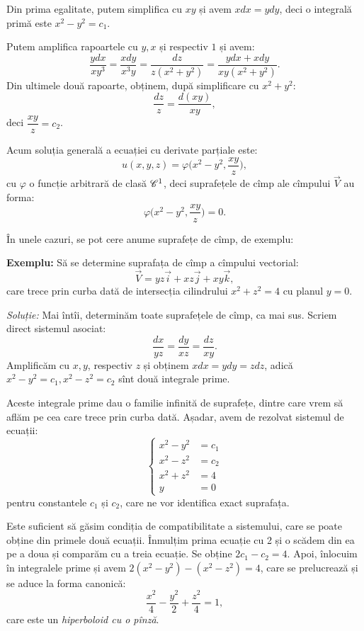 Din prima egalitate, putem simplifica cu $ xy $ și avem $ xdx = ydy $, deci
o integrală primă este $ x^2 - y^2 = c_1 $.

Putem amplifica rapoartele cu $ y, x $ și respectiv $ 1 $ și avem:
\[
  \dfrac{ydx}{xy^3} = \dfrac{xdy}{x^3y} = \dfrac{dz}{z(x^2 + y^2)} = %
  \dfrac{ydx + xdy}{xy(x^2 + y^2)}.
\]
Din ultimele două rapoarte, obținem, după simplificare cu $ x^2 + y^2 $:
\[
  \dfrac{dz}{z} = \dfrac{d(xy)}{xy},
\]
deci $ \dfrac{xy}{z} = c_2 $.

Acum soluția generală a ecuației cu derivate parțiale este:
\[
  u(x, y, z) = \varphi\Big(x^2 - y^2, \dfrac{xy}{z} \Big),
\]
cu $ \varphi $ o funcție arbitrară de clasă $ \mathscr{C}^1 $, deci suprafețele de
cîmp ale cîmpului $ \vec{V} $ au forma:
\[
  \varphi\Big( x^2 - y^2, \dfrac{xy}{z} \Big) = 0.
\]

\vspace{1cm}

În unele cazuri, se pot cere anume suprafețe de cîmp, de exemplu:

\textbf{Exemplu:} Să se determine suprafața de cîmp a cîmpului vectorial:
\[
  \vec{V} = yz\vec{i} + xz \vec{j} + xy\vec{k},
\]
care trece prin curba dată de intersecția cilindrului $ x^2 + z^2 = 4 $ cu
planul $ y = 0 $.

\emph{Soluție:} Mai întîi, determinăm toate suprafețele de cîmp, ca mai sus.
Scriem direct sistemul asociat:
\[
  \dfrac{dx}{yz} = \dfrac{dy}{xz} = \dfrac{dz}{xy}.
\]
Amplificăm cu $ x, y $, respectiv $ z $ și obținem $ xdx = ydy = zdz $, adică
$ x^2 - y^2 = c_1, x^2 - z^2 = c_2 $ sînt două integrale prime.

Aceste integrale prime dau o familie infinită de suprafețe, dintre care
vrem să aflăm pe cea care trece prin curba dată. Așadar, avem de rezolvat
sistemul de ecuații:
\[
  \begin{cases}
    x^2 - y^2 &= c_1  \\
    x^2 - z^2 &= c_2 \\
    x^2 + z^2 &= 4 \\
    y &= 0
  \end{cases}
\]
pentru constantele $ c_1 $ și $ c_2 $, care ne vor identifica exact suprafața.

Este suficient să găsim condiția de compatibilitate a sistemului, care se poate
obține din primele două ecuații. Înmulțim prima ecuație cu 2 și o scădem din ea
pe a doua și comparăm cu a treia ecuație. Se obține $ 2c_1 - c_2 = 4 $.
Apoi, înlocuim în integralele prime și avem $ 2(x^2 - y^2) - (x^2 - z^2) = 4 $, care
se prelucrează și se aduce la forma canonică:
\[
  \dfrac{x^2}{4} - \dfrac{y^2}{2} + \dfrac{z^2}{4} = 1,
\]
care este un \emph{hiperboloid cu o pînză}.

